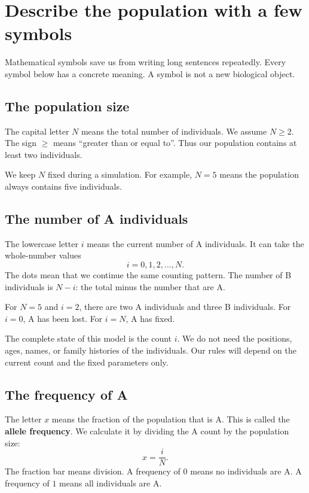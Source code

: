 \section{Describe the population with a few symbols}

Mathematical symbols save us from writing long sentences repeatedly. Every
symbol below has a concrete meaning. A symbol is not a new biological object.

\subsection{The population size}

The capital letter \(N\) means the total number of individuals. We assume
\(N\geq 2\). The sign \(\geq\) means ``greater than or equal to''. Thus our
population contains at least two individuals.

We keep \(N\) fixed during a simulation. For example, \(N=5\) means the
population always contains five individuals.

\subsection{The number of A individuals}

The lowercase letter \(i\) means the current number of A individuals. It can
take the whole-number values
\[
  i=0,1,2,\ldots,N.
\]
The dots mean that we continue the same counting pattern. The number of B
individuals is \(N-i\): the total minus the number that are A.

For \(N=5\) and \(i=2\), there are two A individuals and three B individuals.
For \(i=0\), A has been lost. For \(i=N\), A has fixed.

The complete state of this model is the count \(i\). We do not need the
positions, ages, names, or family histories of the individuals. Our rules
will depend on the current count and the fixed parameters only.

\subsection{The frequency of A}

The letter \(x\) means the fraction of the population that is A. This is
called the \textbf{allele frequency}. We calculate it by dividing the A count
by the population size:
\[
  x=\frac{i}{N}.
\]
The fraction bar means division. A frequency of \(0\) means no individuals
are A. A frequency of \(1\) means all individuals are A.

